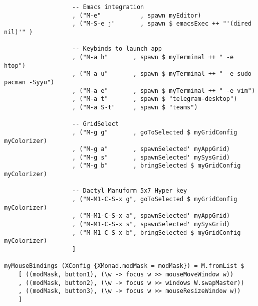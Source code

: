 \documentclass[11pt]{article}
\begin{document}
\begin{verbatim}
                   -- Emacs integration
                   , ("M-e"           , spawn myEditor)
                   , ("M-S-e j"       , spawn $ emacsExec ++ "'(dired nil)'" )
                   
                   -- Keybinds to launch app
                   , ("M-a h"       , spawn $ myTerminal ++ " -e htop")
                   , ("M-a u"       , spawn $ myTerminal ++ " -e sudo pacman -Syyu")
                   , ("M-a e"       , spawn $ myTerminal ++ " -e vim")
                   , ("M-a t"       , spawn $ "telegram-desktop")
                   , ("M-a S-t"     , spawn $ "teams")

                   -- GridSelect 
                   , ("M-g g"       , goToSelected $ myGridConfig myColorizer)
                   , ("M-g a"       , spawnSelected' myAppGrid)
                   , ("M-g s"       , spawnSelected' mySysGrid)
                   , ("M-g b"       , bringSelected $ myGridConfig myColorizer)

                   -- Dactyl Manuform 5x7 Hyper key
                   , ("M-M1-C-S-x g", goToSelected $ myGridConfig myColorizer)
                   , ("M-M1-C-S-x a", spawnSelected' myAppGrid)
                   , ("M-M1-C-S-x s", spawnSelected' mySysGrid)
                   , ("M-M1-C-S-x b", bringSelected $ myGridConfig myColorizer)
                   ]

myMouseBindings (XConfig {XMonad.modMask = modMask}) = M.fromList $
    [ ((modMask, button1), (\w -> focus w >> mouseMoveWindow w))
    , ((modMask, button2), (\w -> focus w >> windows W.swapMaster))
    , ((modMask, button3), (\w -> focus w >> mouseResizeWindow w))
    ]

\end{verbatim}
\end{document}
